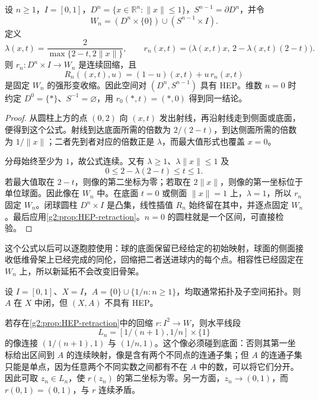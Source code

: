 \begin{proposition}\label{g2:prop:disk-hep}
	设 \(n\ge1\)，\(I=[0,1]\)，\(D^n=\{x\in\mathbb R^n:\lVert x\rVert\le1\}\)，\(S^{n-1}=\partial D^n\)，并令
	\[
		W_n=(D^n\times\{0\})\cup(S^{n-1}\times I).
	\]
	定义
	\[
		\lambda(x,t)=\frac{2}{\max\{2-t,2\lVert x\rVert\}},\qquad
		r_n(x,t)=\bigl(\lambda(x,t)x,\,2-\lambda(x,t)(2-t)\bigr).
	\]
	则 \(r_n:D^n\times I\to W_n\) 是连续回缩，且
	\[
		R_n((x,t),u)=(1-u)(x,t)+u\,r_n(x,t)
	\]
	是固定 \(W_n\) 的强形变收缩。因此空间对 \((D^n,S^{n-1})\) 具有 HEP。维数 \(n=0\) 时约定 \(D^0=\{*\}\)、\(S^{-1}=\varnothing\)，用 \(r_0(*,t)=(*,0)\) 得到同一结论。
\end{proposition}
\begin{proof}
	从圆柱上方的点 \((0,2)\) 向 \((x,t)\) 发出射线，再沿射线走到侧面或底面，便得到这个公式。射线到达底面所需的倍数为 \(2/(2-t)\)，到达侧面所需的倍数为 \(1/\lVert x\rVert\)；二者先到者对应的倍数正是 \(\lambda\)，而最大值形式也覆盖 \(x=0\)。

	分母始终至少为 \(1\)，故公式连续。又有 \(\lambda\ge1\)、\(\lambda\lVert x\rVert\le1\) 及
	\[
		0\le 2-\lambda(2-t)\le t\le1.
	\]
	若最大值取在 \(2-t\)，则像的第二坐标为零；若取在 \(2\lVert x\rVert\)，则像的第一坐标位于单位球面。因此像在 \(W_n\) 中。在底面 \(t=0\) 或侧面 \(\lVert x\rVert=1\) 上，\(\lambda=1\)，所以 \(r_n\) 固定 \(W_n\)。闭球圆柱 \(D^n\times I\) 是凸集，线性插值 \(R_n\) 始终留在其中，并逐点固定 \(W_n\)。最后应用\cref{g2:prop:HEP-retraction}。\(n=0\) 的圆柱就是一个区间，可直接检验。
\end{proof}

这个公式以后可以逐胞腔使用：球的底面保留已经给定的初始映射，球面的侧面接收低维骨架上已经完成的同伦，回缩把二者送进球内的每个点。相容性已经固定在 \(W_n\) 上，所以新延拓不会改变旧骨架。

\begin{example}\label{g2:exm:closed-pair-not-HEP}
	设 \(I=[0,1]\)、\(X=I\)，\(A=\{0\}\cup\{1/n:n\ge1\}\)，均取通常拓扑及子空间拓扑。则 \(A\) 在 \(X\) 中闭，但 \((X,A)\) 不具有 HEP。

	若存在\cref{g2:prop:HEP-retraction}中的回缩 \(r:I^2\to W\)，则水平线段
	\[
		L_n=[1/(n+1),1/n]\times\{1\}
	\]
	的像连接 \((1/(n+1),1)\) 与 \((1/n,1)\)。这个像必须碰到底面：否则其第一坐标给出区间到 \(A\) 的连续映射，像是含有两个不同点的连通子集；但 \(A\) 的连通子集只能是单点，因为任意两个不同实数之间都有不在 \(A\) 中的数，可以将它们分开。因此可取 \(z_n\in L_n\)，使 \(r(z_n)\) 的第二坐标为零。另一方面，\(z_n\to(0,1)\)，而 \(r(0,1)=(0,1)\)，与 \(r\) 连续矛盾。
\end{example}

